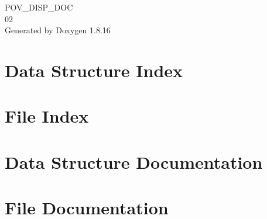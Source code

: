 \let\mypdfximage\pdfximage\def\pdfximage{\immediate\mypdfximage}\documentclass[twoside]{book}
\newcommand{\+}{\discretionary{\mbox{\scriptsize$\hookleftarrow$}}{}{}}
\newcommand{\clearemptydoublepage}{%
  \newpage{\pagestyle{empty}\cleardoublepage}%
}
\begin{document}
\begin{titlepage}
\vspace*{7cm}
\begin{center}%
{\Large P\+O\+V\+\_\+\+D\+I\+S\+P\+\_\+\+D\+OC \\[1ex]\large 02 }\\
\vspace*{1cm}
{\large Generated by Doxygen 1.8.16}\\
\end{center}
\end{titlepage}
\clearemptydoublepage
{}
\tableofcontents
\clearemptydoublepage
{}

\chapter{Data Structure Index}

\chapter{File Index}

\chapter{Data Structure Documentation}





\chapter{File Documentation}













































\backmatter
\newpage
{}
\clearemptydoublepage
{}
\printindex
\end{document}
